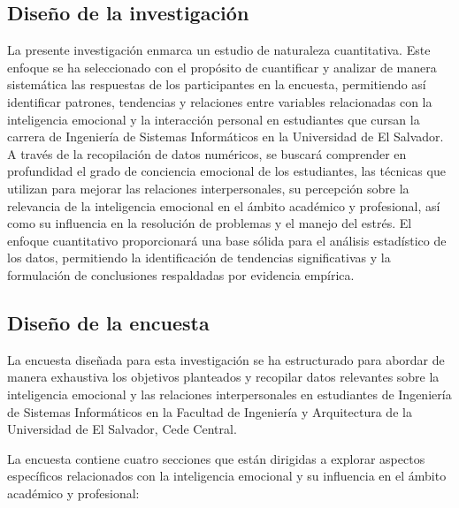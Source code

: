 \documentclass[journal]{IEEEtran}
\begin{document}
\subsection{Diseño de la investigación}
La presente investigación enmarca un estudio de naturaleza cuantitativa. Este enfoque se ha seleccionado con el propósito de cuantificar y analizar de manera sistemática las respuestas de los participantes en la encuesta, permitiendo así identificar patrones, tendencias y relaciones entre variables relacionadas con la inteligencia emocional y la interacción personal en estudiantes que cursan la carrera de Ingeniería de Sistemas Informáticos en la Universidad de El Salvador. A través de la recopilación de datos numéricos, se buscará comprender en profundidad el grado de conciencia emocional de los estudiantes, las técnicas que utilizan para mejorar las relaciones interpersonales, su percepción sobre la relevancia de la inteligencia emocional en el ámbito académico y profesional, así como su influencia en la resolución de problemas y el manejo del estrés. El enfoque cuantitativo proporcionará una base sólida para el análisis estadístico de los datos, permitiendo la identificación de tendencias significativas y la formulación de conclusiones respaldadas por evidencia empírica.
\subsection{Diseño de la encuesta}
La encuesta diseñada para esta investigación se ha estructurado para abordar de manera exhaustiva los objetivos planteados y recopilar datos relevantes sobre la inteligencia emocional y las relaciones interpersonales en estudiantes de Ingeniería de Sistemas Informáticos en la Facultad de Ingeniería y Arquitectura de la Universidad de El Salvador, Cede Central.

La encuesta contiene cuatro secciones que están dirigidas a explorar aspectos específicos relacionados con la inteligencia emocional y su influencia en el ámbito académico y profesional:
\end{document}
